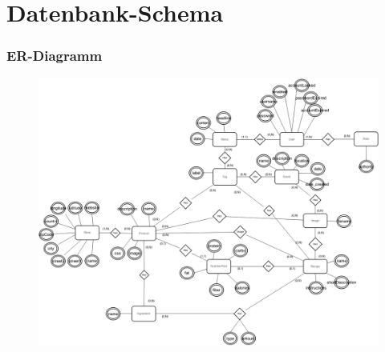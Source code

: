 \section{Datenbank-Schema}

\begin{frame}
	\frametitle{ER-Diagramm}
	\begin{figure}
	\includegraphics[scale=0.2]{bilder/er-diagramm.png}
	\end{figure}
\end{frame}